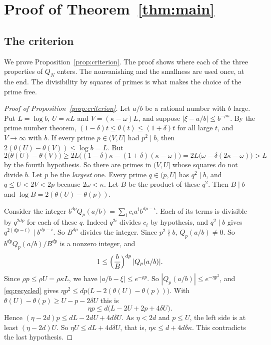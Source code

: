 \section{Proof of Theorem~\ref{thm:main}}\label{sec:proof}

\subsection{The criterion}
We prove Proposition~\ref{prop:criterion}. The proof shows where each of the three properties of $Q_N$
enters. The nonvanishing and the smallness are used once, at the end. The divisibility by squares of primes
is what makes the choice of the prime free.

\begin{proof}[Proof of Proposition~\ref{prop:criterion}]
Let $a/b$ be a rational number with $b$ large. Put $L=\log b$, $U=\kappa L$ and $V=(\kappa-\omega)L$, and
suppose $|\xi-a/b|\le b^{-\rho\kappa}$. By the prime number theorem, $(1-\delta)t\le\theta(t)\le(1+\delta)t$
for all large $t$, and $V\to\infty$ with $b$. If every prime $p\in(V,U]$ had $p^2\mid b$, then
$2(\theta(U)-\theta(V))\le\log b=L$. But
\[
 2\bigl(\theta(U)-\theta(V)\bigr)\ge2L\bigl((1-\delta)\kappa-(1+\delta)(\kappa-\omega)\bigr)
 =2L\bigl(\omega-\delta(2\kappa-\omega)\bigr)>L
\]
by the fourth hypothesis. So there are primes in $(V,U]$ whose squares do not divide $b$. Let $p$ be the
\emph{largest} one. Every prime $q\in(p,U]$ has $q^2\mid b$, and $q\le U<2V<2p$ because $2\omega<\kappa$.
Let $B$ be the product of these $q^2$. Then $B\mid b$ and $\log B=2(\theta(U)-\theta(p))$.

Consider the integer $b^{dp}Q_p(a/b)=\sum_ic_ia^ib^{dp-i}$. Each of its terms is divisible by $q^{2dp}$ for
each of these $q$. Indeed $q^{2i}$ divides $c_i$ by hypothesis, and $q^2\mid b$ gives $q^{2(dp-i)}\mid b^{dp-i}$.
So $B^{dp}$ divides the integer. Since $p^2\nmid b$, $Q_p(a/b)\ne0$. So $b^{dp}Q_p(a/b)/B^{dp}$ is a nonzero
integer, and
\begin{equation}\label{eq:recycled}
 1\le\Bigl(\frac bB\Bigr)^{dp}\,|Q_p(a/b)| .
\end{equation}
Since $\rho p\le\rho U=\rho\kappa L$, we have $|a/b-\xi|\le e^{-\rho p}$. So $|Q_p(a/b)|\le e^{-\eta p^2}$, and
\eqref{eq:recycled} gives $\eta p^2\le dp\bigl(L-2(\theta(U)-\theta(p))\bigr)$. With
$\theta(U)-\theta(p)\ge U-p-2\delta U$ this is
\[
 \eta p\le d\bigl(L-2U+2p+4\delta U\bigr).
\]
Hence $(\eta-2d)p\le dL-2dU+4d\delta U$. As $\eta<2d$ and $p\le U$, the left side is at least $(\eta-2d)U$. So
$\eta U\le dL+4d\delta U$, that is, $\eta\kappa\le d+4d\delta\kappa$. This contradicts the last hypothesis.
\end{proof}

